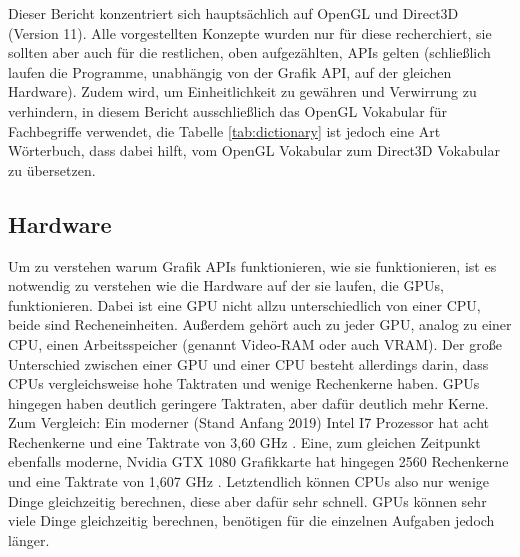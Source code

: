 
Dieser Bericht konzentriert sich hauptsächlich auf OpenGL und Direct3D (Version 11). Alle vorgestellten Konzepte wurden nur für diese recherchiert, sie sollten aber auch für die restlichen, oben aufgezählten, APIs gelten (schließlich laufen die Programme, unabhängig von der Grafik API, auf der gleichen Hardware). Zudem wird, um Einheitlichkeit zu gewähren und Verwirrung zu verhindern, in diesem Bericht ausschließlich das OpenGL Vokabular für Fachbegriffe verwendet, die Tabelle \ref{tab:dictionary} ist jedoch eine Art Wörterbuch, dass dabei hilft, vom OpenGL Vokabular zum Direct3D Vokabular zu übersetzen.

\subsection{Hardware}
\label{sec:graphicsapis:hardware}
Um zu verstehen warum Grafik APIs funktionieren, wie sie funktionieren, ist es notwendig zu verstehen wie die Hardware auf der sie laufen, die GPUs, funktionieren. Dabei ist eine GPU nicht allzu unterschiedlich von einer CPU, beide sind Recheneinheiten. Außerdem gehört auch zu jeder GPU, analog zu einer CPU, einen Arbeitsspeicher (genannt Video-RAM oder auch VRAM). Der große Unterschied zwischen einer GPU und einer CPU besteht allerdings darin, dass CPUs vergleichsweise hohe Taktraten und wenige Rechenkerne haben. GPUs hingegen haben deutlich geringere Taktraten, aber dafür deutlich mehr Kerne. Zum Vergleich: Ein moderner (Stand Anfang 2019) Intel I7 Prozessor hat acht Rechenkerne und eine Taktrate von 3,60 GHz \cite{intel_i7_9700k_processor}. Eine, zum gleichen Zeitpunkt ebenfalls moderne, Nvidia GTX 1080 Grafikkarte hat hingegen 2560 Rechenkerne und eine Taktrate von 1,607 GHz \cite{nvidia_gtx_1080_gpu}. Letztendlich können CPUs also nur wenige Dinge gleichzeitig berechnen, diese aber dafür sehr schnell. GPUs können sehr viele Dinge gleichzeitig berechnen, benötigen für die einzelnen Aufgaben jedoch länger.
